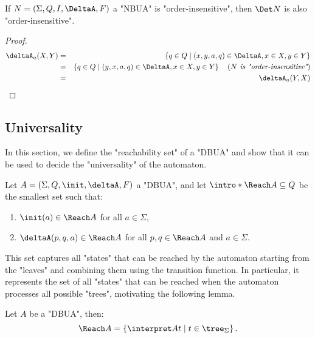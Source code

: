 \documentclass[a4paper,UKenglish,cleveref, autoref, thm-restate]{lipics-v2021}
\begin{document}
\begin{lemma}
	If $N = \NBUA$ a "NBUA" is "order-insensitive", then $\Det N$ is also "order-insensitive".
\end{lemma}

\begin{proof}
	\begin{eqnarray*}
		\deltaA_a (X,Y) &=& \setdef {q \in Q} {(x,y,a,q) \in \DeltaA, x \in X, y \in Y} \\
		&=& \setdef {q \in Q} {(y,x,a,q) \in \DeltaA, x \in X, y \in Y}  \reason {$N$ is "order-insensitive"} \\
		&=& \deltaA_a (Y,X)
	\end{eqnarray*}
\end{proof}

\subsection{Universality}\label{sec:UniversalityAutomata}

In this section, we define the "reachability set" of a "DBUA" and show that it can be used to decide the "universality" of the automaton.

\begin{definition}
	\AP Let $A = \DBUA$ a "DBUA", and let $\intro* \Reach A \subseteq Q$ be the smallest set such that:
	\begin{enumerate}
		\item $\init(a) \in \Reach A$ for all $a \in \Sigma$,
		\item $\deltaA(p, q, a) \in \Reach A$ for all $p, q \in \Reach A$ and $a \in \Sigma$.
	\end{enumerate}
\end{definition}

This set captures all "states" that can be reached by the automaton starting from the "leaves" and combining them using the transition function.
In particular, it represents the set of all "states" that can be reached when the automaton processes all possible "trees", motivating the following lemma.

\begin{lemma}
	Let $A$ be a "DBUA", then:
	\[
		\Reach A = \setdef {\interpret A t} {t \in \tree_\Sigma}.
	\]
\end{lemma}
\end{document}
